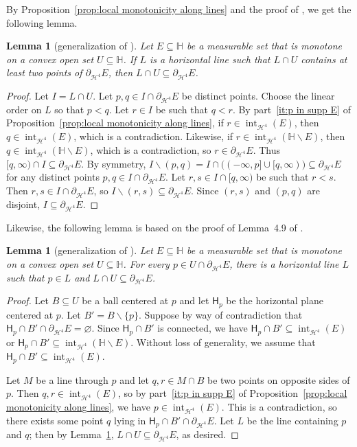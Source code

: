 \documentclass[11pt,reqno]{amsart}
\renewcommand{\H}{\mathbb{H}}
\newcommand{\cH}{\mathcal{H}}
\newcommand{\0}{\mathbf{0}}
\renewcommand{\1}{\mathbf 1}
\renewcommand{\subset}{\subseteq}
\renewcommand{\setminus}{\smallsetminus}
\renewcommand{\emptyset}{\varnothing}
\newtheorem{lemma}[thm]{Lemma}
\theoremstyle{remark}
\DeclareMathOperator{\inter}{int}
\begin{document}
By Proposition~\ref{prop:local monotonicity along lines} and the proof of \cite[Lemma~4.8]{CheegerKleinerMetricDiff}, we get the following lemma.
\begin{lemma}[{generalization of \cite[Lemma~4.8]{CheegerKleinerMetricDiff}}]\label{lem:monotone boundary U-convex}
  Let $E\subset \H$ be a measurable set that is monotone on a convex open set $U\subset \H$.  If $L$ is a horizontal line such that $L\cap U$ contains at least two points of $\partial_{\cH^4} E$, then $L\cap U\subset \partial_{\cH^4} E$.
\end{lemma}
\begin{proof}
  Let $I=L\cap U$.  Let $p,q\in I\cap \partial_{\cH^4} E$ be distinct points.  Choose the linear order on $L$ so that $p<q$.  Let $r\in I$ be such that $q<r$.  By part~\eqref{it:p in supp E} of Proposition~\ref{prop:local monotonicity along lines}, if $r\in \inter_{\cH^4} (E)$, then $q\in \inter_{\cH^4} (E)$, which is a contradiction.  Likewise, if $r\in \inter_{\cH^4} (\H\setminus E)$, then $q\in \inter_{\cH^4} (\H\setminus E)$, which is a contradiction, so $r\in \partial_{\cH^4} E$.  Thus $[q,\infty)\cap I \subset \partial_{\cH^4} E$.  By symmetry,
  $I\setminus (p,q)=I\cap \bigl((-\infty,p] \cup [q,\infty)\bigr)\subset \partial_{\cH^4} E$
  for any distinct points $p, q\in I\cap \partial_{\cH^4} E$. Let $r, s \in I\cap [q,\infty)$ be such that $r<s$.  Then $r,s\in I\cap \partial_{\cH^4} E$, so $I\setminus (r,s)\subset \partial_{\cH^4} E$.  Since $(r,s)$ and $(p,q)$ are disjoint, $I\subset \partial_{\cH^4} E$.
\end{proof}

Likewise, the following lemma is based on the proof of Lemma~4.9 of \cite{CheegerKleinerMetricDiff}.
\begin{lemma}[{generalization of \cite[Lemma~4.9]{CheegerKleinerMetricDiff}}]\label{lem:monotone is union of lines}
  Let $E\subset \H$ be a measurable set that is monotone on a convex open set $U\subset \H$.  For every $p\in U\cap \partial_{\cH^4} E$, there is a horizontal line $L$ such that $p\in L$ and $L\cap U\subset \partial_{\cH^4} E$.
\end{lemma}
\begin{proof}
  Let $B\subset U$ be a ball centered at $p$ and let $\mathsf{H}_p$ be the horizontal plane centered at $p$.  Let $B'=B\setminus \{p\}$.  Suppose by way of contradiction that $\mathsf{H}_p\cap B'\cap \partial_{\cH^4} E =\emptyset$.  Since $\mathsf{H}_p\cap B'$ is connected, we have $\mathsf{H}_p\cap B'\subset \inter_{\cH^4} (E)$ or $\mathsf{H}_p \cap B'\subset \inter_{\cH^4} (\H\setminus E)$.  Without loss of generality, we assume that $\mathsf{H}_p\cap B'\subset \inter_{\cH^4} (E)$.

  Let $M$ be a line through $p$ and let $q,r\in M\cap B$ be two points on opposite sides of $p$.  Then $q,r\in \inter_{\cH^4}(E)$, so by part~\eqref{it:p in supp E} of Proposition~\ref{prop:local monotonicity along lines}, we have $p\in \inter_{\cH^4}(E)$.  This is a contradiction, so there exists some point $q$ lying in $\mathsf{H}_p\cap B'\cap  \partial_{\cH^4} E$.  Let $L$ be the line containing $p$ and $q$; then by Lemma~\ref{lem:monotone boundary U-convex}, $L\cap U\subset \partial_{\cH^4} E$, as desired.
\end{proof}
\end{document}
